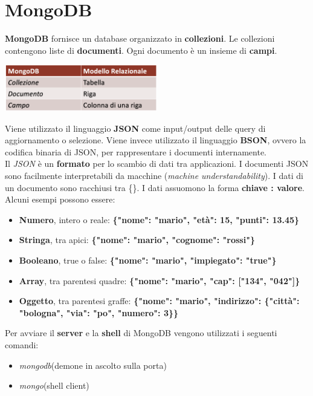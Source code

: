 \documentclass{article}
\begin{document}
\pagestyle{empty}

\section*{MongoDB} 
\large

\textbf{MongoDB} fornisce un database organizzato in \textbf{collezioni}. Le collezioni contengono liste di \textbf{documenti}. Ogni documento è un insieme di \textbf{campi}.
\begin{center}
    \includegraphics[width=0.5\textwidth]{foto 1.png}
\end{center}
Viene utilizzato il linguaggio \textbf{JSON} come input/output delle query di aggiornamento o selezione. Viene invece utilizzato il linguaggio \textbf{BSON}, ovvero la codifica binaria di JSON, per rappresentare i documenti internamente.\vspace{14pt}\\
Il \textit{JSON} è un \textbf{formato} per lo scambio di dati tra applicazioni. I documenti JSON sono facilmente interpretabili da macchine (\textit{machine understandability}). I dati di un documento sono racchiusi tra \{\}. I dati assuomono la forma \textbf{chiave : valore}. Alcuni esempi possono essere:
\begin{itemize}[label={ }, leftmargin=1cm]
    \itemsep0em
    \item \textbf{Numero}, intero o reale: \textbf{\{"nome": "mario", "età": 15, "punti": 13.45\}}
    \item \textbf{Stringa}, tra apici: \textbf{\{"nome": "mario", "cognome": "rossi"\}}
    \item \textbf{Booleano}, true o false: \textbf{\{"nome": "mario", "impiegato": "true"\}}
    \item \textbf{Array}, tra parentesi quadre: \textbf{\{"nome": "mario", "cap": ["134", "042"]\}}
    \item \textbf{Oggetto}, tra parentesi graffe: \textbf{\{"nome": "mario", "indirizzo": \{"città": "bologna", "via": "po", "numero": 3\}\}}\vspace{14pt}
\end{itemize}
Per avviare il \textbf{server} e la \textbf{shell} di MongoDB vengono utilizzati i seguenti comandi:
\begin{itemize}[label={ }, leftmargin=1cm]
    \itemsep0em
    \item \textit{mongodb}\quad (demone in ascolto sulla porta)
    \item \textit{mongo}\quad (shell client)
\end{itemize}
\end{document}
